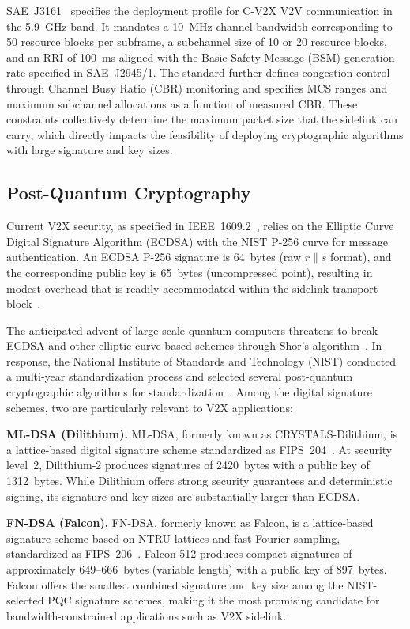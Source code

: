 \documentclass[letterpaper,journal]{IEEEtran}
\begin{document}
SAE~J3161~\cite{sae_j3161} specifies the deployment profile for C-V2X V2V communication in the 5.9~GHz band. It mandates a 10~MHz channel bandwidth corresponding to 50 resource blocks per subframe, a subchannel size of 10 or 20 resource blocks, and an RRI of 100~ms aligned with the Basic Safety Message (BSM) generation rate specified in SAE~J2945/1. The standard further defines congestion control through Channel Busy Ratio (CBR) monitoring and specifies MCS ranges and maximum subchannel allocations as a function of measured CBR. These constraints collectively determine the maximum packet size that the sidelink can carry, which directly impacts the feasibility of deploying cryptographic algorithms with large signature and key sizes.

\subsection{Post-Quantum Cryptography}
\label{sec:pqc}

Current V2X security, as specified in IEEE~1609.2~\cite{ieee_16092}, relies on the Elliptic Curve Digital Signature Algorithm (ECDSA) with the NIST P-256 curve for message authentication. An ECDSA P-256 signature is 64~bytes (raw $r \| s$ format), and the corresponding public key is 65~bytes (uncompressed point), resulting in modest overhead that is readily accommodated within the sidelink transport block~\cite{ieee_16092}.

The anticipated advent of large-scale quantum computers threatens to break ECDSA and other elliptic-curve-based schemes through Shor's algorithm~\cite{shor1994algorithms}. In response, the National Institute of Standards and Technology (NIST) conducted a multi-year standardization process and selected several post-quantum cryptographic algorithms for standardization~\cite{nist_pqc_report}. Among the digital signature schemes, two are particularly relevant to V2X applications:

\textbf{ML-DSA (Dilithium).} ML-DSA, formerly known as CRYSTALS-Dilithium, is a lattice-based digital signature scheme standardized as FIPS~204~\cite{fips204}. At security level~2, Dilithium-2 produces signatures of 2420~bytes with a public key of 1312~bytes. While Dilithium offers strong security guarantees and deterministic signing, its signature and key sizes are substantially larger than ECDSA.

\textbf{FN-DSA (Falcon).} FN-DSA, formerly known as Falcon, is a lattice-based signature scheme based on NTRU lattices and fast Fourier sampling, standardized as FIPS~206~\cite{fips206}. Falcon-512 produces compact signatures of approximately 649--666~bytes (variable length) with a public key of 897~bytes. Falcon offers the smallest combined signature and key size among the NIST-selected PQC signature schemes, making it the most promising candidate for bandwidth-constrained applications such as V2X sidelink.
\end{document}
